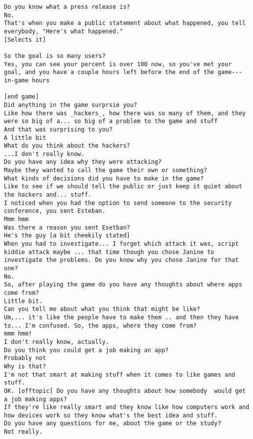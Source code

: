 \begin{lstlisting}
Do you know what a press release is?
No.
That's when you make a public statement about what happened, you tell everybody, "Here's what happened."
[Selects it]

So the goal is so many users?
Yes, you can see your percent is over 100 now, so you've met your goal, and you have a couple hours left before the end of the game---in-game hours

[end game]
Did anything in the game surprsie you?
Like how there was _hackers_, how there was so many of them, and they were so big of a... so big of a problem to the game and stuff
And that was surprising to you?
A little bit
What do you think about the hackers?
...I don't really know.
Do you have any idea why they were attacking?
Maybe they wanted to call the game their own or something?
What kinds of decisions did you have to make in the game?
Like to see if we should tell the public or just keep it quiet about the hackers and... stuff.
I noticed when you had the option to send someone to the security conference, you sent Esteban.
Mmm hmm
Was there a reason you sent Esetban?
He's the guy [a bit cheekily stated]
When you had to investigate... I forget which attack it was, script kiddie attack maybe ... that time though you chose Janine to investigate the problems. Do you know why you chose Janine for that one?
No.
So, after playing the game do you have any thoughts about where apps come from?
Little bit.
Can you tell me about what you think that might be like?
Um,... it's like the people have to make them .. and then they have to... I'm confused. So, the apps, where they come from?
mmm hmm!
I don't really know, actually.
Do you think you could get a job making an app?
Probably not
Why is that?
I'm not that smart at making stuff when it comes to like games and stuff.
OK. [offtopic] Do you have any thoughts about how somebody  would get a job making apps?
If they're like really smart and they know like how computers work and how devices work so they know what's the best idea and stuff.
Do you have any questions for me, about the game or the study?
Not really.
\end{lstlisting}

